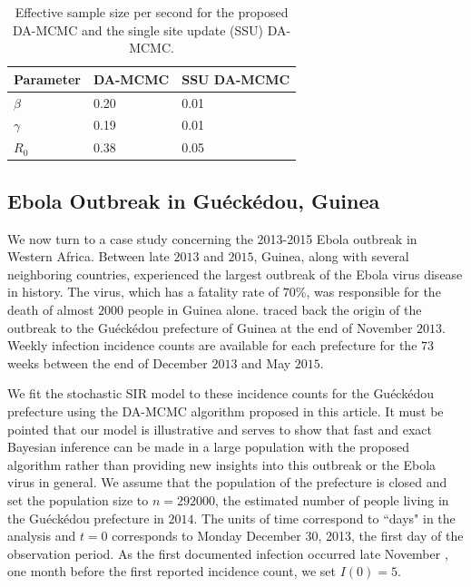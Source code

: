 \documentclass[12pt]{article}
\begin{document}
	\begin{table}
		\caption{Effective sample size per second for the proposed DA-MCMC and the single site update (SSU) DA-MCMC.
			\label{tab:E6}}
		\begin{center}
			\begin{tabular}{ C{2cm}| *{2}{C{3cm}}}
				Parameter & DA-MCMC & SSU DA-MCMC \\ 
				\hline
				$\beta$ & 0.20 & 0.01 \\ 
				$\gamma$ & 0.19 & 0.01 \\ 
				$R_0$ & 0.38 & 0.05 \\
				\hline
			\end{tabular}
		\end{center}
	\end{table}
	
	\subsection{Ebola Outbreak in Gu\'eck\'edou, Guinea}
	\label{sec:ebo}
	
	We now turn to a case study concerning the 2013-2015 Ebola outbreak in Western Africa.
	Between late $2013$ and $2015$, Guinea, along with several neighboring countries, experienced the largest outbreak of the Ebola virus disease in history. The virus, which has a fatality rate of $70\%$, was responsible for the death of almost $2000$ people in Guinea alone.
	\cite{Coltart.2017} traced back the origin of the outbreak to the Gu\'eck\'edou prefecture of Guinea at the end of November $2013$. Weekly infection incidence counts are available for each prefecture for the $73$ weeks between the end of December $2013$ and May $2015$.
	
	We fit the stochastic SIR model to these incidence counts for the Gu\'eck\'edou prefecture using the DA-MCMC algorithm proposed in this article.
	It must be pointed that our model is illustrative and serves to show that fast and exact Bayesian inference can be made in a large population with the proposed algorithm rather than providing new insights into this outbreak or the Ebola virus in general. We assume that the population of the prefecture is closed and set the population size to $n = 292000$, the estimated number of people living in the Gu\'eck\'edou prefecture in $2014$.
	The units of time correspond to ``days" in the analysis and $t=0$ corresponds to Monday December 30, 2013, the first day of the observation period.
	As the first documented infection occurred late November \cite{Coltart.2017}, one month before the first reported incidence count, we set $I(0) = 5$.
	
\end{document}
